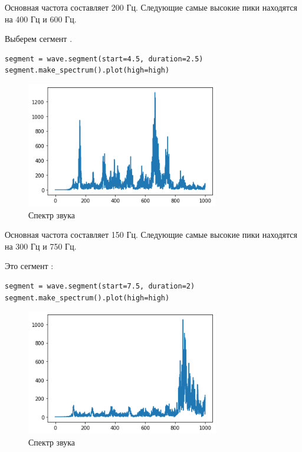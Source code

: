 \documentclass[a4paper,12pt]{report}
\begin{document}
Основная частота составляет 200 Гц. Следующие самые высокие пики находятся на 400 Гц и 600 Гц.

Выберем сегмент .

\begin{lstlisting}[caption=Спектр звука \textquote{i}]
segment = wave.segment(start=4.5, duration=2.5)
segment.make_spectrum().plot(high=high)
\end{lstlisting}

\begin{figure}[H]
        \centering
        \includegraphics[width=0.75\textwidth]{lab3_fig6_4.png}
        \caption{Спектр звука }
        \label{fig:lab3_fig6_4}
\end{figure}

Основная частота составляет 150 Гц. Следующие самые высокие пики находятся на 300 Гц и 750 Гц.

Это сегмент :

\begin{lstlisting}[caption=Спектр звука \textquote{o}]
segment = wave.segment(start=7.5, duration=2)
segment.make_spectrum().plot(high=high)
\end{lstlisting}

\begin{figure}[H]
        \centering
        \includegraphics[width=0.75\textwidth]{lab3_fig6_5.png}
        \caption{Спектр звука }
        \label{fig:lab3_fig6_5}
\end{figure}
\end{document}
